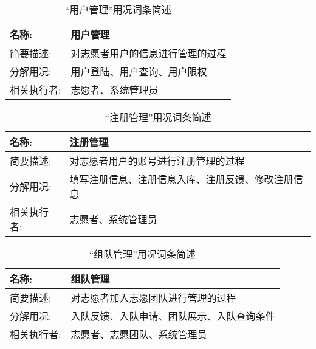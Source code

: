 \begin{table}[H]  
\caption{“用户管理”用况词条简述}  
\begin{center}  
    \begin{tabular}{l p{11cm}} 
        \hline
        \quad 名称:  & 用户管理 \\
        \hline
        \quad 简要描述:  & 对志愿者用户的信息进行管理的过程 \\
        \hline
        \quad 分解用况:  & 用户登陆、用户查询、用户限权 \\
        \hline
        \quad 相关执行者:  & 志愿者、系统管理员 \\
        \hline
    \end{tabular}
    \label{tab1}
\end{center}
\end{table}

\begin{table}[H]  
\caption{“注册管理”用况词条简述}  
\begin{center}  
    \begin{tabular}{l p{11cm}} 
        \hline
        \quad 名称:  & 注册管理 \\
        \hline
        \quad 简要描述:  & 对志愿者用户的账号进行注册管理的过程 \\
        \hline
        \quad 分解用况:  & 填写注册信息、注册信息入库、注册反馈、修改注册信息 \\
        \hline
        \quad 相关执行者:  & 志愿者、系统管理员 \\
        \hline
    \end{tabular}
    \label{tab1}
\end{center}
\end{table}

\begin{table}[H]  
\caption{“组队管理”用况词条简述}  
\begin{center}  
    \begin{tabular}{l p{11cm}} 
        \hline
        \quad 名称:  & 组队管理 \\
        \hline
        \quad 简要描述:  & 对志愿者加入志愿团队进行管理的过程 \\
        \hline
        \quad 分解用况:  & 入队反馈、入队申请、团队展示、入队查询条件 \\
        \hline
        \quad 相关执行者:  & 志愿者、志愿团队、系统管理员 \\
        \hline
    \end{tabular}
    \label{tab1}
\end{center}
\end{table}

